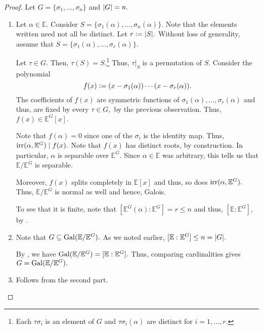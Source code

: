 \artin*\label{thm:artin2}
\begin{flushright}\hyperref[thm:artin]{\upsym}\end{flushright}
\begin{proof}
    Let $G = \{\sigma_1, \ldots, \sigma_n\}$ and ${\left\lvert G \right\lvert} = n.$
    \begin{enumerate}
        \item Let $\alpha \in \mathbb{E}.$ Consider $S = \{\sigma_1(\alpha), \ldots, \sigma_n(\alpha)\}.$ Note that the elements written need not all be distinct. Let $r \vcentcolon= {\left\lvert S \right\lvert}.$ Without loss of generality, assume that $S = \{\sigma_1(\alpha), \ldots, \sigma_r(\alpha)\}.$

        Let $\tau \in G.$ Then, $\tau(S) = S.$\footnote{Each $\tau\sigma_i$ is an element of $G$ and $\tau\sigma_i(\alpha)$ are distinct for $i = 1, \ldots, r.$} Thus, $\tau|_{S}$ is a permutation of $S.$ Consider the polynomial
        \begin{equation*} 
            f(x) \vcentcolon= (x - \sigma_1(\alpha)) \cdots (x - \sigma_r(\alpha)).
        \end{equation*}
        The coefficients of $f(x)$ are symmetric functions of $\sigma_1(\alpha), \ldots, \sigma_r(\alpha)$ and thus, are fixed by every $\tau \in G,$ by the previous observation. Thus, $f(x) \in \mathbb{E}^G[x].$

        Note that $f(\alpha) = 0$ since one of the $\sigma_i$ is the identity map. Thus, $\operatorname{irr}(\alpha, \mathbb{E}^G) \mid f(x).$ Note that $f(x)$ has distinct roots, by construction. In particular, $\alpha$ is separable over $\mathbb{E}^G.$ Since $\alpha \in \mathbb{E}$ was arbitrary, this tells us that $\mathbb{E}/\mathbb{E}^G$ is separable.

        Moreover, $f(x)$ splits completely in $\mathbb{E}[x]$ and thus, so does $\operatorname{irr}(\alpha, \mathbb{E}^G).$ Thus, $\mathbb{E}/\mathbb{E}^G$ is normal as well and hence, Galois.

        To see that it is finite, note that $[\mathbb{E}^G(\alpha) : \mathbb{E}^G] = r \le n$ and thus, $[\mathbb{E} : \mathbb{E}^G],$ by .
        \item Note that $G \subseteq \operatorname{Gal}(\mathbb{E}/\mathbb{E}^G).$ As we noted earlier, $[\mathbb{E} : \mathbb{E}^G] \le n = {\left\lvert G \right\lvert}.$ 

        By , we have $\operatorname{Gal}(\mathbb{E}/\mathbb{E}^G) = [\mathbb{E} : \mathbb{E}^G].$ Thus, comparing cardinalities gives $G = \operatorname{Gal}(\mathbb{E}/\mathbb{E}^G).$
        \item Follows from the second part. \qedhere
    \end{enumerate}
\end{proof}

